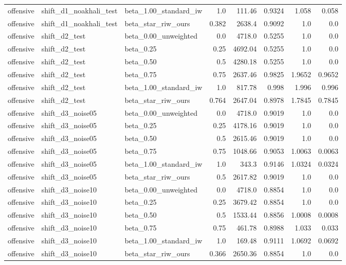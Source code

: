 \begin{table}[htbp]
{\begin{tabular}{lllrrrrr}
offensive & shift\_d1\_noakhali\_test & beta\_1.00\_standard\_iw & 1.0 & 111.46 & 0.9324 & 1.058 & 0.058 \\
offensive & shift\_d1\_noakhali\_test & beta\_star\_riw\_ours & 0.382 & 2638.4 & 0.9092 & 1.0 & 0.0 \\
offensive & shift\_d2\_test & beta\_0.00\_unweighted & 0.0 & 4718.0 & 0.5255 & 1.0 & 0.0 \\
offensive & shift\_d2\_test & beta\_0.25 & 0.25 & 4692.04 & 0.5255 & 1.0 & 0.0 \\
offensive & shift\_d2\_test & beta\_0.50 & 0.5 & 4280.18 & 0.5255 & 1.0 & 0.0 \\
offensive & shift\_d2\_test & beta\_0.75 & 0.75 & 2637.46 & 0.9825 & 1.9652 & 0.9652 \\
offensive & shift\_d2\_test & beta\_1.00\_standard\_iw & 1.0 & 817.78 & 0.998 & 1.996 & 0.996 \\
offensive & shift\_d2\_test & beta\_star\_riw\_ours & 0.764 & 2647.04 & 0.8978 & 1.7845 & 0.7845 \\
offensive & shift\_d3\_noise05 & beta\_0.00\_unweighted & 0.0 & 4718.0 & 0.9019 & 1.0 & 0.0 \\
offensive & shift\_d3\_noise05 & beta\_0.25 & 0.25 & 4178.16 & 0.9019 & 1.0 & 0.0 \\
offensive & shift\_d3\_noise05 & beta\_0.50 & 0.5 & 2615.46 & 0.9019 & 1.0 & 0.0 \\
offensive & shift\_d3\_noise05 & beta\_0.75 & 0.75 & 1048.66 & 0.9053 & 1.0063 & 0.0063 \\
offensive & shift\_d3\_noise05 & beta\_1.00\_standard\_iw & 1.0 & 343.3 & 0.9146 & 1.0324 & 0.0324 \\
offensive & shift\_d3\_noise05 & beta\_star\_riw\_ours & 0.5 & 2617.82 & 0.9019 & 1.0 & 0.0 \\
offensive & shift\_d3\_noise10 & beta\_0.00\_unweighted & 0.0 & 4718.0 & 0.8854 & 1.0 & 0.0 \\
offensive & shift\_d3\_noise10 & beta\_0.25 & 0.25 & 3679.42 & 0.8854 & 1.0 & 0.0 \\
offensive & shift\_d3\_noise10 & beta\_0.50 & 0.5 & 1533.44 & 0.8856 & 1.0008 & 0.0008 \\
offensive & shift\_d3\_noise10 & beta\_0.75 & 0.75 & 461.78 & 0.8988 & 1.033 & 0.033 \\
offensive & shift\_d3\_noise10 & beta\_1.00\_standard\_iw & 1.0 & 169.48 & 0.9111 & 1.0692 & 0.0692 \\
offensive & shift\_d3\_noise10 & beta\_star\_riw\_ours & 0.366 & 2650.36 & 0.8854 & 1.0 & 0.0 \\

\end{tabular}}
\end{table}
